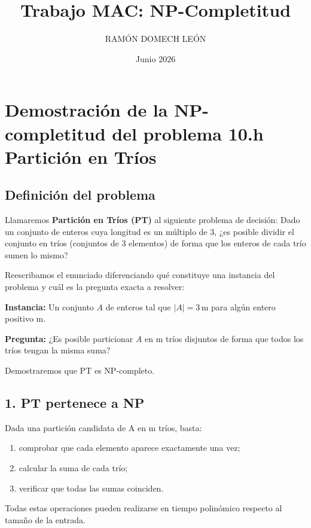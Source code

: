 \documentclass{article}
\title{Trabajo MAC: NP-Completitud}
\author{RAMÓN DOMECH LEÓN}
\date{Junio 2026}
\begin{document}
\setlength{\parindent}{0pt}
\maketitle

\section*{Demostración de la NP-completitud del problema 10.h Partición en Tríos}

\subsection*{Definición del problema}

Llamaremos \textbf{Partición en Tríos (PT)} al siguiente problema de decisión: Dado un conjunto de enteros cuya longitud es un múltiplo de
3, ¿es posible dividir el conjunto en tríos (conjuntos de 3 elementos) de forma que
los enteros de cada trío sumen lo mismo?

\vspace{1\baselineskip}
Reescribamos el enunciado diferenciando qué constituye una instancia del problema y cuál es la pregunta exacta a resolver:

\medskip

\textbf{Instancia:} Un conjunto $A$ de enteros tal que $\lvert A \rvert = 3 \, \text{m}$ para algún entero positivo m.

\textbf{Pregunta:} ¿Es posible particionar $A$ en m tríos disjuntos de forma que todos los tríos tengan la misma suma?

\medskip

Demostraremos que PT es NP-completo.

\subsection*{1. PT pertenece a NP}

Dada una partición candidata de A en m tríos, basta:

\begin{enumerate}
\item comprobar que cada elemento aparece exactamente una vez;
\item calcular la suma de cada trío;
\item verificar que todas las sumas coinciden.
\end{enumerate}

Todas estas operaciones pueden realizarse en tiempo polinómico respecto al tamaño de la entrada.
\end{document}

